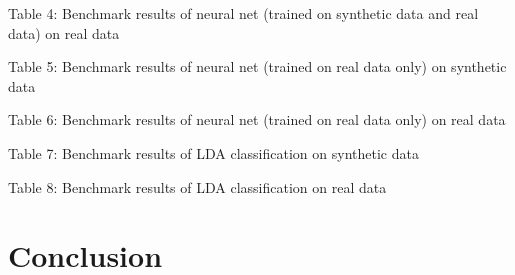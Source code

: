 \documentclass[11pt]{article}
\begin{document}
\begin{center}

\end{center}
Table 4: Benchmark results of neural net (trained on synthetic data and real data) on real data

\begin{center}

\end{center}
Table 5: Benchmark results of neural net (trained on real data only) on synthetic data


\begin{center}

\end{center}
Table 6: Benchmark results of neural net (trained on real data only) on real data


\begin{center}

\end{center}
Table 7: Benchmark results of LDA classification on synthetic data

\begin{center}

\end{center}
Table 8: Benchmark results of LDA classification on real data


\section{Conclusion}
\begin{adjustbox}{width=\columnwidth,center}

\end{adjustbox}
\end{document}
